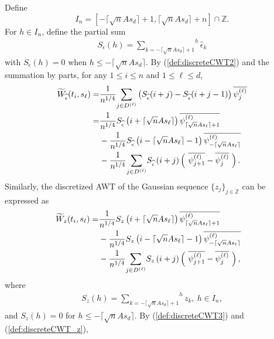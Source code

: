 \documentclass{amsart}
\begin{document}
Define
$$I_{n} = [-\lceil \sqrt{n}As_{d}\rceil+1, \lceil \sqrt{n}As_{d}\rceil+n]\cap \mathbb{Z}.$$
For $h\in I_{n}$,
define the partial sum
\begin{align*}
S_{\widehat{\epsilon}}(h) = \overset{h}{\underset{k=-\lceil \sqrt{n}As_{d}\rceil+1}{\sum}}\widehat{\epsilon}_{k}
\end{align*}
with $S_{\widehat{\epsilon}}(h)=0$ when $h\leq -\lceil \sqrt{n}As_{d}\rceil$.
By (\ref{def:discreteCWT2}) and the summation by parts,
for any $1\leq i\leq n$ and $1\leq \ell \leq d$,
\begin{align}\notag
\widetilde{W}_{\widehat{\epsilon}}(t_{i},s_{\ell})
=&\frac{1}{n^{1/4}}\underset{j\in D^{(\ell)}}{\sum}\left(S_{\widehat{\epsilon}}(i+j)-S_{\widehat{\epsilon}}(i+j-1)\right)\overline{\psi_{j}^{(\ell)}}
\\\notag=&\frac{1}{n^{1/4}}S_{\widehat{\epsilon}}\left(i+\lceil \sqrt{n}As_{\ell}\rceil\right) \overline{\psi_{\lceil \sqrt{n}As_{\ell}\rceil+1}^{(\ell)}}
\\\notag&-\frac{1}{n^{1/4}}S_{\widehat{\epsilon}}\left(i-\lceil \sqrt{n}As_{\ell}\rceil-1\right)\overline{\psi_{-\lceil \sqrt{n}As_{\ell}\rceil}^{(\ell)}}
\\\label{def:discreteCWT3}&-\frac{1}{n^{1/4}}\underset{j\in D^{(\ell)}}{\sum}S_{\widehat{\epsilon}}\left(i+j\right)\left(\ \overline{\psi^{(\ell)}_{j+1}}-\overline{\psi^{(\ell)}_{j}}\ \right).
\end{align}
Similarly, the discretized AWT of the Gaussian sequence $\{z_{j}\}_{j\in \mathbb{Z}}$ can be expressed as
\begin{align}\notag
\hspace{-0.3cm}\widetilde{W}_{z}(t_{i},s_{\ell})
=& \frac{1}{n^{1/4}}S_{z}\left(i+\lceil \sqrt{n}As_{\ell}\rceil\right)\overline{\psi_{\lceil \sqrt{n}As_{\ell}\rceil+1}^{(\ell)}}
\\\notag&-\frac{1}{n^{1/4}}S_{z}\left(i-\lceil \sqrt{n}As_{\ell}\rceil-1\right)\overline{\psi_{-\lceil \sqrt{n}As_{\ell}\rceil}^{(\ell)}}
\\\label{def:discreteCWT_z}&-\frac{1}{n^{1/4}}\underset{j\in D^{(\ell)}}{\sum}S_{z}\left(i+j\right)\left(\ \overline{\psi^{(\ell)}_{j+1}}-\overline{\psi^{(\ell)}_{j}}\ \right),
\end{align}
where
\begin{align*}
S_{z}(h) = \overset{h}{\underset{k=-\lceil \sqrt{n}As_{d}\rceil+1 }{\sum}}z_{k},\ h\in I_{n},
\end{align*}
and $S_{z}(h)=0$ for $h\leq-\lceil \sqrt{n}As_{d}\rceil$.
By (\ref{def:discreteCWT3}) and (\ref{def:discreteCWT_z}),
\end{document}
